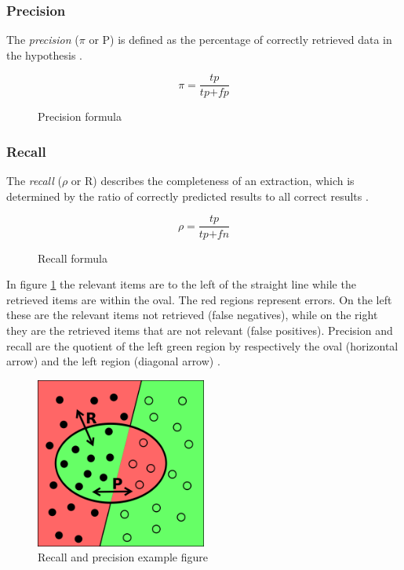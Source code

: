 \newpage
\subsubsection{Precision}
The \textit{precision} (\ensuremath{\pi} or P) is defined as the percentage of correctly retrieved data in the hypothesis \cite{Carstensen:2010}. 

\begin{figure}[H]
\begin{displaymath}
	\pi = \frac{\textit{tp}}{\textit{tp} + \textit{fp}}
\end{displaymath}
\caption{Precision formula}
\end{figure}

\subsubsection{Recall}
The \textit{recall} (\ensuremath{\rho} or R) describes the completeness of an extraction, which is determined by the ratio of correctly predicted results to all correct results \cite{Carstensen:2010}.

\begin{figure}[H]
\begin{displaymath}
	\rho = \frac{\textit{tp}}{\textit{tp} + \textit{fn}}
\end{displaymath}
\caption{Recall formula}
\end{figure}

In figure \ref{fig:recall-precision} the relevant items are to the left of the straight line while the retrieved items are within the oval. The red regions represent errors. On the left these are the relevant items not retrieved (false negatives), while on the right they are the retrieved items that are not relevant (false positives). Precision and recall are the quotient of the left green region by respectively the oval (horizontal arrow) and the left region (diagonal arrow) \cite{Wikipedia:Precision_and_recall}.

\begin{figure}[H]
\centering
\includegraphics[width=0.5\textwidth]{recall-precision.png}
\caption{Recall and precision example figure \cite{Wikipedia:Precision_and_recall}}
\label{fig:recall-precision}
\end{figure}

